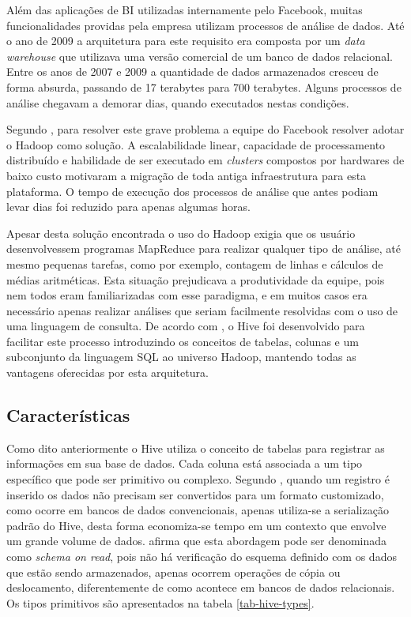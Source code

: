 Além das aplicações de BI utilizadas internamente pelo Facebook, muitas funcionalidades providas pela empresa utilizam processos de análise de dados. Até o ano de 2009 a arquitetura para este requisito era composta por um \textit{data warehouse} que utilizava uma versão comercial de um banco de dados relacional. Entre os anos de 2007 e 2009 a quantidade de dados armazenados cresceu de forma absurda, passando de 17 terabytes para 700 terabytes. Alguns processos de análise chegavam a demorar dias, quando executados nestas condições.

Segundo , para resolver este grave problema a equipe do Facebook resolver adotar o Hadoop como solução. A escalabilidade linear, capacidade de processamento distribuído e habilidade de ser executado em \textit{clusters} compostos por hardwares de baixo custo motivaram a migração de toda antiga infraestrutura para esta plataforma. O tempo de execução dos processos de análise que antes podiam levar dias foi reduzido para apenas algumas horas.

Apesar desta solução encontrada o uso do Hadoop exigia que os usuário desenvolvessem programas MapReduce para realizar qualquer tipo de análise, até mesmo pequenas tarefas, como por exemplo, contagem de linhas e cálculos de médias aritméticas. Esta situação prejudicava a produtividade da equipe, pois nem todos eram familiarizadas com esse paradigma, e em muitos casos era necessário apenas realizar análises que seriam facilmente resolvidas com o uso de uma linguagem de consulta. De acordo com , o Hive foi desenvolvido para facilitar este processo introduzindo os conceitos de tabelas, colunas e um subconjunto da linguagem SQL ao universo Hadoop, mantendo todas as vantagens oferecidas por esta arquitetura.

\subsection{Características}

Como dito anteriormente o Hive utiliza o conceito de tabelas para registrar as informações em sua base de dados. Cada coluna está associada a um tipo específico que pode ser primitivo ou complexo. Segundo , quando um registro é inserido os dados não precisam ser convertidos para um formato customizado, como ocorre em bancos de dados convencionais, apenas utiliza-se a serialização padrão do Hive, desta forma economiza-se tempo em um contexto que envolve um grande volume de dados.  afirma que esta abordagem pode ser denominada como \textit{schema on read}, pois não há verificação do esquema definido com os dados que estão sendo armazenados, apenas ocorrem operações de cópia ou deslocamento, diferentemente de como acontece em bancos de dados relacionais. Os tipos primitivos são apresentados na tabela \ref{tab-hive-types}.

